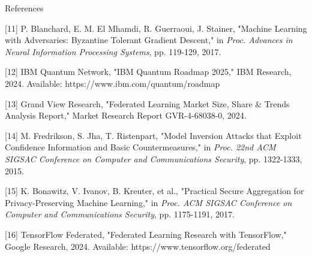 \documentclass[aspectratio=169,11pt]{beamer}
\begin{document}
\begin{frame}[allowframebreaks]{References}
\framebreak

[11] P. Blanchard, E. M. El Mhamdi, R. Guerraoui, J. Stainer, "Machine Learning with Adversaries: Byzantine Tolerant Gradient Descent," in \textit{Proc. Advances in Neural Information Processing Systems}, pp. 119-129, 2017.

[12] IBM Quantum Network, "IBM Quantum Roadmap 2025," IBM Research, 2024. Available: https://www.ibm.com/quantum/roadmap

[13] Grand View Research, "Federated Learning Market Size, Share \& Trends Analysis Report," Market Research Report GVR-4-68038-0, 2024.

[14] M. Fredrikson, S. Jha, T. Ristenpart, "Model Inversion Attacks that Exploit Confidence Information and Basic Countermeasures," in \textit{Proc. 22nd ACM SIGSAC Conference on Computer and Communications Security}, pp. 1322-1333, 2015.

[15] K. Bonawitz, V. Ivanov, B. Kreuter, et al., "Practical Secure Aggregation for Privacy-Preserving Machine Learning," in \textit{Proc. ACM SIGSAC Conference on Computer and Communications Security}, pp. 1175-1191, 2017.

[16] TensorFlow Federated, "Federated Learning Research with TensorFlow," Google Research, 2024. Available: https://www.tensorflow.org/federated

\end{frame}
\end{document}
